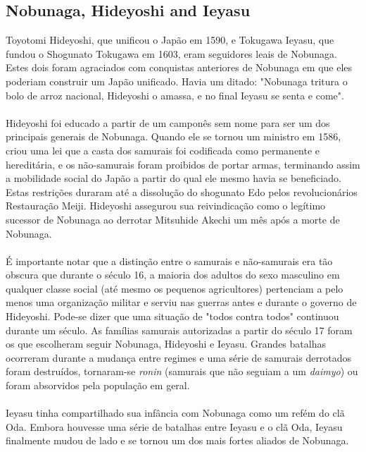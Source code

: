 \documentclass[12pt, a4paper]{article}
\begin{document}
		\subsection{Nobunaga, Hideyoshi and Ieyasu}
			Toyotomi Hideyoshi, que unificou o Japão em 1590, e Tokugawa Ieyasu, que fundou o Shogunato Tokugawa em 1603, eram seguidores leais de Nobunaga. Estes dois foram agraciados com conquistas anteriores de Nobunaga em que eles poderiam construir um Japão unificado. Havia um ditado: "Nobunaga tritura o bolo de arroz nacional, Hideyoshi o amassa, e no final Ieyasu se senta e come".\\
			\\
			\indent Hideyoshi foi educado a partir de um camponês sem nome para ser um dos principais generais de Nobunaga. Quando ele se tornou um ministro em 1586, criou uma lei que a casta dos samurais foi codificada como permanente e hereditária, e os não-samurais foram proibidos de portar armas, terminando assim a mobilidade social do Japão a partir do qual ele mesmo havia se beneficiado. Estas restrições duraram até a dissolução do shogunato Edo pelos revolucionários Restauração Meiji. Hideyoshi assegurou sua reivindicação como o legítimo sucessor de Nobunaga ao derrotar Mitsuhide Akechi um mês após a morte de Nobunaga.\\
			\\
			\indent É importante notar que a distinção entre o samurais e não-samurais era tão obscura que durante o século 16, a maioria dos adultos do sexo masculino em qualquer classe social (até mesmo os pequenos agricultores) pertenciam a pelo menos uma organização militar e serviu nas guerras antes e durante o governo de Hideyoshi. Pode-se dizer que uma situação de "todos contra todos" continuou durante um século. As famílias samurais autorizadas a partir do século 17 foram os que escolheram seguir Nobunaga, Hideyoshi e Ieyasu. Grandes batalhas ocorreram durante a mudança entre regimes e uma série de samurais derrotados foram destruídos, tornaram-se \textit{ronin} (samurais que não seguiam a um \textit{daimyo}) ou foram absorvidos pela população em geral.\\
			\\
			\indent Ieyasu tinha compartilhado sua infância com Nobunaga como um refém do clã Oda. Embora houvesse uma série de batalhas entre Ieyasu e o clã Oda, Ieyasu finalmente mudou de lado e se tornou um dos mais fortes aliados de Nobunaga.\\
    \newpage
\end{document}
